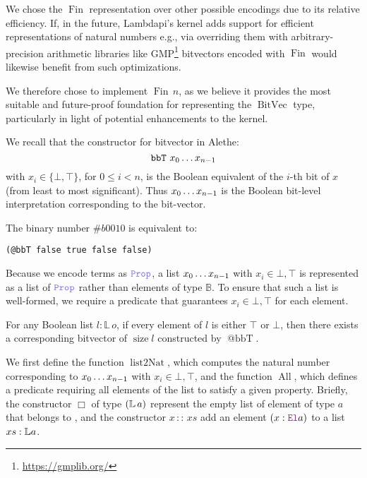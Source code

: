 We chose the $\mathop{Fin}$ representation over other possible encodings due to its relative efficiency.
If, in the future, Lambdapi's kernel adds support for efficient representations of natural numbers e.g.,
via overriding them with arbitrary-precision arithmetic libraries like GMP\footnote{\url{https://gmplib.org/}} bitvectors encoded with $\mathop{Fin}$ would likewise benefit from such optimizations.

We therefore chose to implement $\mathop{Fin}\,n$, as we believe it provides the most suitable and future-proof foundation for representing the $\mathop{BitVec}$ type,
particularly in light of potential enhancements to the kernel.


We recall that the constructor for bitvector in Alethe: $$\mathtt{bbT}\ \enum[n-1]{x}[][0]$$ with $x_i\in\{\bot,\top\}$, for $0\leq i< n$,
is the Boolean equivalent of the $i$-th bit of $x$ (from least to most significant). Thus $\enum[n-1]{x}[][0]$ is the Boolean bit-level interpretation corresponding to the bit-vector. 

\begin{example}
The binary number $\#b0010$ is equivalent to:

\begin{lstlisting}[language=SMT]
(@bbT false true false false)
\end{lstlisting}
\end{example}

Because we encode  terms as $\prop$, a list $\enum[n-1]{x}[][0]$ with $x_i \in {\bot, \top}$ is represented as a list of $\prop$ rather than elements of type $\mathbb{B}$.
To ensure that such a list is well-formed, we require a predicate that guarantees $x_i \in {\bot, \top}$ for each element.

\begin{lemma}
For any Boolean list $l : \mathbb{L}\,o$, if every element of $l$ is either $\top$ or $\bot$, then there exists a corresponding bitvector of $\mathop{size} l$ constructed by $\mathop{@bbT}$.
\label{lem:bbt}
\end{lemma}

We first define the function $\mathop{list2Nat}$, which computes the natural number corresponding to $\enum[n-1]{x}[][0]$
with $x_i \in {\bot, \top}$, and the function $\mathop{All}$, which defines a predicate requiring all elements of the list to satisfy a given property.
Briefly, the constructor $\Box$ of type $(\mathbb{L}\,a)$ represent the empty list of element of type $a$ that belongs to \set, and the constructor $x\,::\,xs$ add an element $(x: \el{} a)$ to a list $xs: \mathbb{L}a$.

